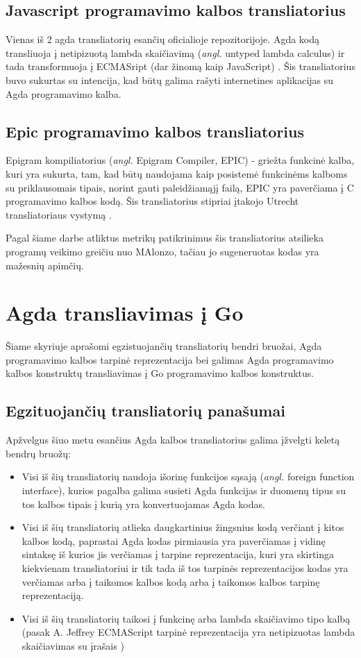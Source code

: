 \documentclass{VUMIFPSkursinis}
\begin{document}
\subsection{Javascript programavimo kalbos transliatorius}
Vienas iš 2 agda transliatorių esančių oficialioje repozitorijoje. Agda kodą transliuoja į netipizuotą lambda skaičiavimą (\textit{angl.} untyped lambda calculus) ir tada transformuoja į ECMASript (dar žinomą kaip JavaScript) \cite{html_agda}. Šis transliatorius buvo sukurtas su intencija, kad būtų galima rašyti internetines aplikacijas su Agda programavimo kalba.
\subsection{Epic programavimo kalbos transliatorius}
Epigram kompiliatorius (\textit{angl.} Epigram Compiler, EPIC) - griežta funkcinė kalba, kuri yra sukurta, tam, kad būtų naudojama kaip posistemė funkcinėms kalboms su priklausomais tipais, norint gauti paleidžiamąjį failą, EPIC yra paverčiama į C programavimo kalbos kodą. Šis transliatorius stipriai įtakojo Utrecht transliatoriaus vystymą \cite{Utrecht}.\par Pagal šiame darbe atliktus metrikų patikrinimus šis transliatorius atsilieka programų veikimo greičiu nuo MAlonzo, tačiau jo sugeneruotas kodas yra mažesnių apimčių. 
\section{Agda transliavimas į Go}
Šiame skyriuje aprašomi egzistuojančių transliatorių bendri bruožai, Agda programavimo kalbos tarpinė reprezentacija bei galimas Agda programavimo kalbos konstruktų transliavimas į Go programavimo kalbos konstruktus.
\subsection{Egzituojančių transliatorių panašumai}
Apžvelgus šiuo metu esančius Agda kalbos transliatorius galima įžvelgti keletą bendrų bruožų:
\begin{itemize}
	\item Visi iš šių transliatorių naudoja išorinę funkcijos sąsają (\textit{angl.} foreign function interface), kurios pagalba galima susieti Agda funkcijas ir duomenų tipus su tos kalbos tipais į kurią yra konvertuojamas Agda kodas.
	\item Visi iš šių transliatorių atlieka daugkartinius žingsnius kodą verčiant į kitos kalbos kodą, paprastai Agda kodas pirmiausia yra paverčiamas į vidinę sintaksę iš kurios jis verčiamas į tarpine reprezentacija, kuri yra skirtinga kiekvienam transliatoriui ir tik tada iš tos tarpinės reprezentacijos kodas yra verčiamas arba į taikomos kalbos kodą arba į taikomos kalbos tarpinę reprezentaciją.
	\item Visi iš šių transliatorių taikosi į funkcinę arba lambda skaičiavimo tipo kalbą (pasak A. Jeffrey ECMAScript tarpinė reprezentacija yra netipizuotas lambda skaičiavimas su įrašais \cite{html_agda})
\end{itemize}
\end{document}
